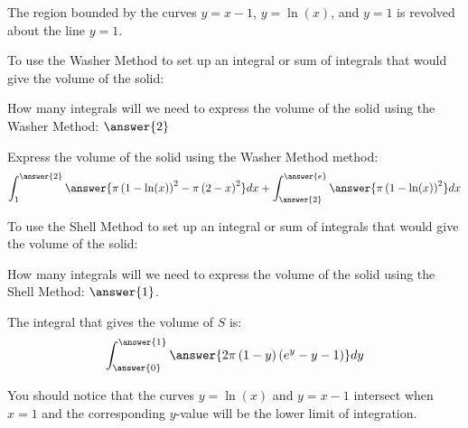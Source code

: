 \documentclass{ximera}
\author{ Jason Miller}
\begin{document}
\begin{exercise}

The region bounded by the curves $y=x-1$, $y=\ln(x)$, and $y=1$ is revolved about the line $y=1$. 

To use the Washer Method to set up an integral or sum of integrals that would give the volume of the solid: 

  \begin{multipleChoice}
  \end{multipleChoice}

How many integrals will we need to express the volume of the solid using the Washer Method: $\answer{2}$

\begin{exercise}

Express the volume of the solid using the Washer Method method: 
\[
\int_{1}^{\answer{2}} \answer{ \pi \left( 1 - \ln(x) \right)^{2} - \pi \left( 2-x \right)^{2} } dx + \int_{\answer{2}}^{\answer{e}} \answer{ \pi \left( 1- \ln(x) \right)^{2} } dx
\]
\end{exercise}
\end{exercise}

\begin{exercise}

To use the Shell Method to set up an integral or sum of integrals that would give the volume of the solid: 

  \begin{multipleChoice}
  \end{multipleChoice}

How many integrals will we need to express the volume of the solid using the Shell Method: $\answer{1}$. 


\begin{exercise} 
The integral that gives the volume of $S$ is: 
\[
\int_{\answer{0}}^{\answer{1}} \answer{ 2\pi \left( 1-y \right) \left( e^{y}-y-1 \right)} dy
\] 

\begin{hint}
You should notice that the curves $y=\ln(x)$ and $y=x-1$ intersect when $x=1$ and the corresponding $y$-value will be the lower limit of integration.
\end{hint}
\end{exercise}
\end{exercise}
\end{document}
